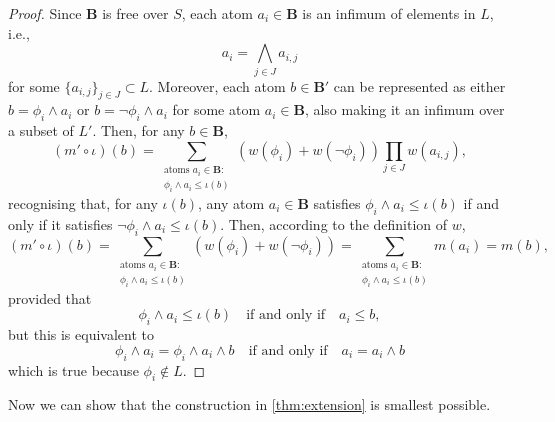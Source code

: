 \documentclass{article}
\theoremstyle{definition}
\theoremstyle{remark}
\begin{document}
\begin{proof} %
  Since $\mathbf{B}$ is free over $S$, each atom $a_i \in \mathbf{B}$ is an
  infimum of elements in $L$, i.e.,
  \[
    a_i = \bigwedge_{j \in J} a_{i,j}
  \]
  for some $\{ a_{i,j} \}_{j \in J} \subset L$. Moreover, each atom $b \in
  \mathbf{B'}$ can be represented as either $b = \phi_i \land a_i$ or $b =
  \neg\phi_i \land a_i$ for some atom $a_i \in \mathbf{B}$, also making it an
  infimum over a subset of $L'$. Then, for any $b \in \mathbf{B}$,
  \[
    (m' \circ \iota)(b) = \sum_{\substack{\text{atoms } a_i \in \mathbf{B}:\\
        \phi_i \land a_i \le \iota(b)}} (w(\phi_i) + w(\neg\phi_i)) \prod_{j \in
    J} w(a_{i,j}),
  \]
  recognising that, for any $\iota(b)$, any atom $a_i \in \mathbf{B}$ satisfies
  $\phi_i \land a_i \le \iota(b)$ if and only if it satisfies $\neg\phi_i \land
  a_i \le \iota(b)$. Then, according to the definition of $w$,
  \[
    (m' \circ \iota)(b) = \sum_{\substack{\text{atoms } a_i \in \mathbf{B}:\\
        \phi_i \land a_i \le \iota(b)}} (w(\phi_i) + w(\neg\phi_i)) =
    \sum_{\substack{\text{atoms } a_i \in \mathbf{B}:\\ \phi_i \land a_i \le
        \iota(b)}} m(a_i) = m(b),
  \]
  provided that
  \[
    \phi_i \land a_i \le \iota(b) \quad \text{if and only if} \quad a_i \le b,
  \]
  but this is equivalent to
  \[
    \phi_i \land a_i = \phi_i \land a_i \land b \quad \text{if and only if}
    \quad a_i = a_i \land b
  \]
  which is true because $\phi_i \not\in L$.
\end{proof}

Now we can show that the construction in \cref{thm:extension} is smallest
possible.
\end{document}
